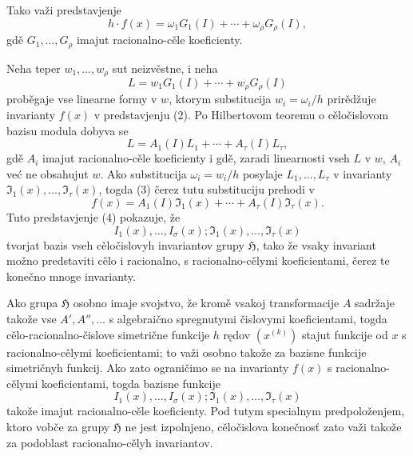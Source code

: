 \documentclass[11pt]{article}
\providecommand{\frH}{\mathfrak H}
\begin{document}
Tako važi predstavjenje
\begin{equation}
        h\cdot f(x)=\omega_1G_1(I)+\cdots+\omega_\rho G_\rho(I),
\end{equation}
gdě \(G_1,\ldots,G_\rho\) imajut racionalno-cěle koeficienty.

Neha teper \(w_1,\ldots,w_\rho\) sut neizvěstne, i neha
\[
        L=w_1G_1(I)+\cdots+w_\rho G_\rho(I)
\]
proběgaje vse linearne formy v \(w\), ktorym substitucija \(w_i=\omega_i/h\) prirědžuje invarianty \(f(x)\) v predstavjenju (2). Po Hilbertovom teoremu o cěločislovom bazisu modula dobyva se
\begin{equation}
        L=A_1(I)L_1+\cdots+A_\tau(I)L_\tau,
\end{equation}
gdě \(A_i\) imajut racionalno-cěle koeficienty i gdě, zaradi linearnosti vseh \(L\) v \(w\), \(A_i\) već ne obsahujut \(w\). Ako substitucija \(\omega_i=w_i/h\) posylaje \(L_1,\ldots,L_\tau\) v invarianty \(\mathfrak I_1(x),\ldots,\mathfrak I_\tau(x)\), togda (3) čerez tutu substituciju prehodi v
\begin{equation}
        f(x)=A_1(I)\mathfrak I_1(x)+\cdots+A_\tau(I)\mathfrak I_\tau(x).
\end{equation}
Tuto predstavjenje (4) pokazuje, že
\[
        I_1(x),\ldots,I_\sigma(x);\mathfrak I_1(x),\ldots,\mathfrak I_\tau(x)
\]
tvorjat bazis vseh cěločislovyh invariantov grupy \(\frH\), tako že vsaky invariant možno predstaviti cělo i racionalno, s racionalno-cělymi koeficientami, čerez te konečno mnoge invarianty.

Ako grupa \(\frH\) osobno imaje svojstvo, že kromě vsakoj transformacije \(A\) sadržaje takože vse \(A',A'',\ldots\) s algebraično spregnutymi čislovymi koeficientami, togda cělo-racionalno-čislove simetrične funkcije \(h\) rędov \((x^{(k)})\) stajut funkcije od \(x\) s racionalno-cělymi koeficientami; to važi osobno takože za bazisne funkcije simetričnyh funkcij. Ako zato ograničimo se na invarianty \(f(x)\) s racionalno-cělymi koeficientami, togda bazisne funkcije
\[
        I_1(x),\ldots,I_\sigma(x);\mathfrak I_1(x),\ldots,\mathfrak I_\tau(x)
\]
takože imajut racionalno-cěle koeficienty. Pod tutym specialnym predpoloženjem, ktoro vobče za grupy \(\frH\) ne jest izpolnjeno, cěločislova konečnosť zato važi takože za podoblast racionalno-cělyh invariantov.
\end{document}
